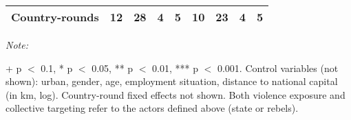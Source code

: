 \begin{table}[!h]
{\begin{threeparttable}
\begin{tabular}[t]{lcccccccc}
Country-rounds & 12 & 28 & 4 & 5 & 10 & 23 & 4 & 5\\
\bottomrule
\end{tabular}
\begin{tablenotes}[para]
\item \textit{Note: } 
\item + p $<$ 0.1, * p $<$ 0.05, ** p $<$ 0.01, *** p $<$ 0.001. Control variables (not shown): urban, gender, age, employment situation, distance to national capital (in km, log). Country-round fixed effects not shown. Both violence exposure and collective targeting refer to the actors defined above (state or rebels).
\end{tablenotes}
\end{threeparttable}}
\end{table}
